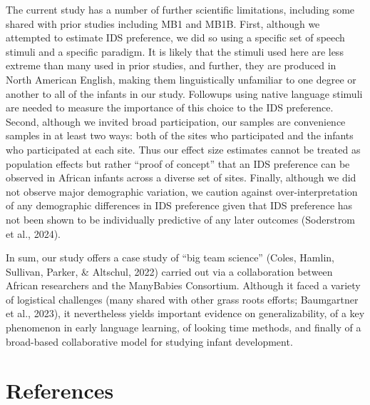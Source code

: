 \documentclass[
  ,man,floatsintext]{apa6}
\begin{document}
The current study has a number of further scientific limitations, including some shared with prior studies including MB1 and MB1B. First, although we attempted to estimate IDS preference, we did so using a specific set of speech stimuli and a specific paradigm. It is likely that the stimuli used here are less extreme than many used in prior studies, and further, they are produced in North American English, making them linguistically unfamiliar to one degree or another to all of the infants in our study. Followups using native language stimuli are needed to measure the importance of this choice to the IDS preference. Second, although we invited broad participation, our samples are convenience samples in at least two ways: both of the sites who participated and the infants who participated at each site. Thus our effect size estimates cannot be treated as population effects but rather ``proof of concept'' that an IDS preference can be observed in African infants across a diverse set of sites. Finally, although we did not observe major demographic variation, we caution against over-interpretation of any demographic differences in IDS preference given that IDS preference has not been shown to be individually predictive of any later outcomes (Soderstrom et al., 2024).

In sum, our study offers a case study of ``big team science'' (Coles, Hamlin, Sullivan, Parker, \& Altschul, 2022) carried out via a collaboration between African researchers and the ManyBabies Consortium. Although it faced a variety of logistical challenges (many shared with other grass roots efforts; Baumgartner et al., 2023), it nevertheless yields important evidence on generalizability, of a key phenomenon in early language learning, of looking time methods, and finally of a broad-based collaborative model for studying infant development.

\newpage

\hypertarget{references}{%
\section{References}\label{references}}

\begingroup
\setlength{\parindent}{-0.5in}
\setlength{\leftskip}{0.5in}
\end{document}
